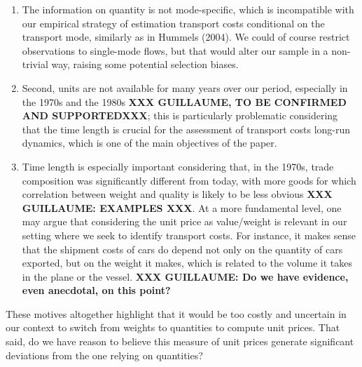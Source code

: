 \documentclass[a4paper,11pt]{article}
\begin{document}
\begin{enumerate}
\item The information on quantity is not mode-specific, which is incompatible with our empirical strategy of estimation transport costs conditional on the transport mode, similarly as in Hummels (2004). We could of course restrict observations to single-mode flows, but that would alter our sample in a non-trivial way, raising some potential selection biases.

\item Second, units are not available for many years over our period, especially in the 1970s and the 1980s \textbf{XXX GUILLAUME, TO BE CONFIRMED AND SUPPORTEDXXX}; this is particularly problematic considering that the time length is crucial for the assessment of transport costs long-run dynamics, which is one of the main objectives of the paper.

\item Time length is especially important considering that, in the 1970s, trade composition was significantly different from today, with more goods for which correlation between weight and quality is likely to be less obvious \textbf{XXX GUILLAUME: EXAMPLES XXX}. At a more fundamental level, one may argue that considering the unit price as value/weight is relevant in our setting where we seek to identify transport costs. For instance, it makes sense that the shipment costs of cars do depend not only on the quantity of cars exported, but on the weight it makes, which is related to the volume it takes in the plane or the vessel. \textbf{XXX GUILLAUME: Do we have evidence, even anecdotal, on this point?}

\end{enumerate}

These motives altogether highlight that it would be too costly and uncertain in our context to switch from weights to quantities to compute unit prices. That said, do we have reason to believe this measure of unit prices generate significant deviations from the one relying on quantities?
\end{document}
